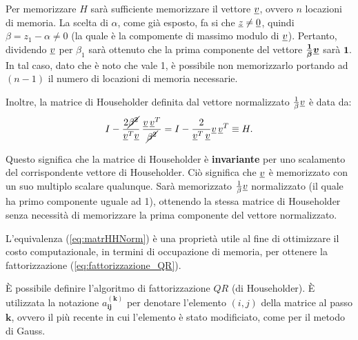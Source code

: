 Per memorizzare $H$ sarà sufficiente memorizzare il vettore $\uline v$, ovvero $n$ locazioni di memoria. La scelta di $\alpha$, come già esposto, fa si che $\uline z\neq\uline 0$, quindi $\beta = z_1-\alpha\neq 0$ (la quale è la compomente di massimo modulo di $\uline v$). Pertanto, dividendo $\uline v$ per $\beta_1$ sarà ottenuto che la prima componente del vettore $\boldsymbol{\frac{1}{\beta}\uline v}$ sarà $\boldsymbol 1$. In tal caso, dato che è noto che vale 1, è possibile non memorizzarlo portando ad $(n-1)$ il numero di locazioni di memoria necessarie.

Inoltre, la matrice di Householder definita dal vettore normalizzato $\frac{1}{\beta}\uline v$ è data da:
\begin{equation}\label{eq:matrHHNorm}
    I-\frac{2\cancel{\beta^2}}{\uline v^T\uline v}\, \frac{\uline v\,\uline v^T}{\cancel{\beta^2}} = I - \frac{2}{\uline v^T\,\uline v}\uline v\,\uline v^T\equiv H.
\end{equation}

Questo significa che la matrice di Householder è \textbf{invariante} per uno scalamento del corrispondente vettore di Householder. Ciò significa che $\uline v$ è memorizzato con un suo multiplo scalare qualunque. Sarà memorizzato $\frac{1}{\beta}\uline v$ normalizzato (il quale ha primo componente uguale ad 1), ottenendo la stessa matrice di Householder senza necessità di memorizzare la prima componente del vettore normalizzato.

L'equivalenza (\ref{eq:matrHHNorm}) è una proprietà utile al fine di ottimizzare il costo computazionale, in termini di occupazione di memoria, per ottenere la fattorizzazione (\ref{eq:fattorizzazione_QR}).

È possibile definire l'algoritmo di fattorizzazione $QR$ (di Householder). È utilizzata la notazione $a_{\boldsymbol{ij}}^{\boldsymbol{(k)}}$ per denotare l'elemento $(i,j)$ della matrice al passo $\boldsymbol k$, ovvero il più recente in cui l'elemento è stato modificiato, come per il metodo di Gauss.

